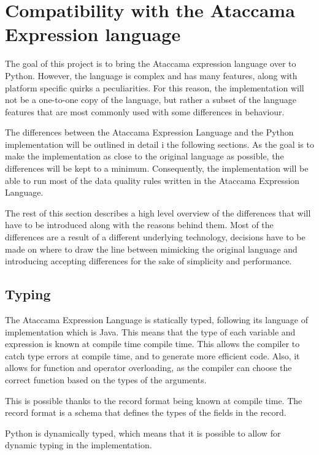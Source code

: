 \section{Compatibility with the Ataccama Expression language}

The goal of this project is to bring the Ataccama expression language over to Python. However, the language is complex and has many features, along with platform specific quirks a peculiarities. For this reason, the implementation will not be a one-to-one copy of the language, but rather a subset of the language features that are most commonly used with some differences in behaviour.

The differences between the Ataccama Expression Language and the Python implementation will be outlined in detail i the following sections. As the goal is to make the implementation as close to the original language as possible, the differences will be kept to a minimum. Consequently, the implementation will be able to run most of the data quality rules written in the Ataccama Expression Language. 

The rest of this section describes a high level overview of the differences that will have to be introduced along with the reasons behind them. Most of the differences are a result of a different underlying technology, decisions have to be made on where to draw the line between mimicking the original language and introducing accepting differences for the sake of simplicity and performance. 

\subsection{Typing}

The Ataccama Expression Language is statically typed, following its language of implementation which is Java. This means that the type of each variable and expression is known at compile time compile time. This allows the compiler to catch type errors at compile time, and to generate more efficient code. Also, it allows for function and operator overloading, as the compiler can choose the correct function based on the types of the arguments.

This is possible thanks to the record format being known at compile time. The record format is a schema that defines the types of the fields in the record. 

Python is dynamically typed, which means that it is possible to allow for dynamic typing in the implementation. 

